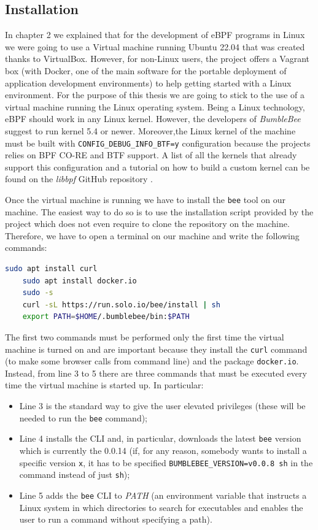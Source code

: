 \subsection{Installation}

In chapter 2 we explained that for the development of eBPF programs in Linux we were going to use a Virtual machine running Ubuntu 22.04 that was created thanks to VirtualBox.
However, for non-Linux users, the project offers a Vagrant box \cite{BumblebeeVagrant} (with Docker, one of the main software for the portable deployment of application development environments) to help getting started with a Linux environment.
For the purpose of this thesis we are going to stick to the use of a virtual machine running the Linux operating system.
Being a Linux technology, eBPF should work in any Linux kernel.
However, the developers of \textit{BumbleBee} suggest to run kernel 5.4 or newer.
Moreover,the Linux kernel of the machine must be built with \verb|CONFIG_DEBUG_INFO_BTF=y| configuration because the projects relies on BPF CO-RE and BTF support.
A list of all the kernels that already support this configuration and a tutorial on how to build a custom kernel can be found on the \textit{libbpf} GitHub repository \cite{BTFKernelConfig}.

Once the virtual machine is running we have to install the \verb|bee| tool on our machine.
The easiest way to do so is to use the installation script provided by the project which does not even require to clone the repository on the machine.
Therefore, we have to open a terminal on our machine and write the following commands:

\begin{lstlisting}[language=bash, caption={bee installation commands}]
	sudo apt install curl
	sudo apt install docker.io 
	sudo -s
	curl -sL https://run.solo.io/bee/install | sh 
	export PATH=$HOME/.bumblebee/bin:$PATH
\end{lstlisting}

The first two commands must be performed only the first time the virtual machine is turned on and are important because they install the \verb|curl| command (to make some browser calls from command line) and the package \verb|docker.io|.
Instead, from line 3 to 5 there are three commands that must be executed every time the virtual machine is started up.
In particular:

\begin{itemize}
	\item Line 3 is the standard way to give the user elevated privileges (these will 
		be needed to run the \verb|bee| command);
	\item Line 4 installs the CLI and, in particular, downloads the latest \verb|bee|
		version which is currently the 0.0.14 (if, for any reason, somebody wants to install a specific version \verb|x|, it has to be specified \verb|BUMBLEBEE_VERSION=v0.0.8 sh| in the command instead of just \verb|sh|);
	\item Line 5 adds the \verb|bee| CLI to \textit{PATH} (an environment variable 
		that instructs a Linux system in which directories to search for executables and enables the user to run a command without specifying a path).
\end{itemize}

